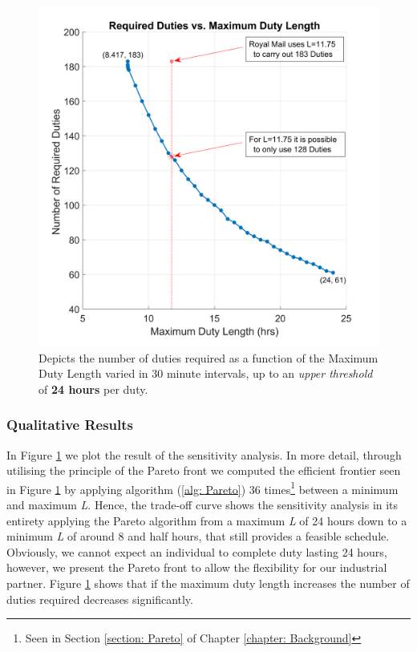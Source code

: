 
\begin{figure}%
    \centering
    \includegraphics[width=0.46\linewidth]{[1] - chapter/Image Files/1-D1M2.png}
    \caption{Depicts the number of duties required as a function of the Maximum Duty Length varied in 30 minute intervals, up to an \textit{upper threshold} of \textbf{24 hours} per duty.}
    \label{fig:1-D1M2}
\end{figure}


\subsubsection*{Qualitative Results}
In Figure \ref{fig:1-D1M2} we plot the result of the sensitivity analysis. In more detail, through utilising the principle of the Pareto front we computed the efficient frontier seen in Figure \ref{fig:1-D1M2} by applying algorithm (\ref{alg: Pareto}) 36 times\footnote{\label{Pareto}Seen in Section \ref{section: Pareto} of Chapter \ref{chapter: Background}} between a minimum and maximum \textit{L}. Hence, the trade-off curve shows the sensitivity analysis in its entirety applying the Pareto algorithm from a maximum \textit{L} of 24 hours down to a minimum \textit{L} of around 8 and half hours, that still provides a feasible schedule. Obviously, we cannot expect an individual to complete duty lasting 24 hours, however, we present the Pareto front to allow the flexibility for our industrial partner. Figure \ref{fig:1-D1M2} shows that if the maximum duty length increases the number of duties required decreases significantly. 



